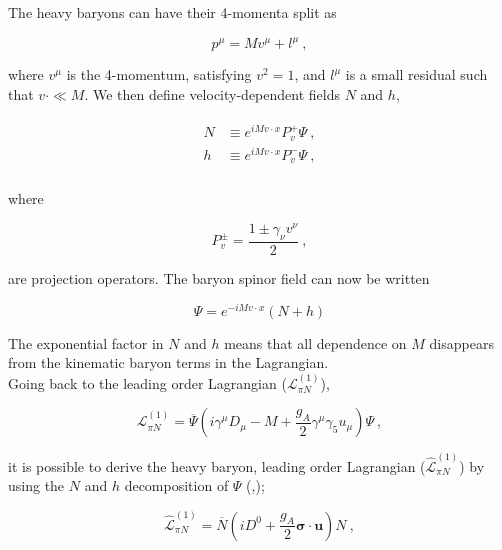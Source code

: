 \documentclass[10pt,twoside]{report}
\begin{document}
	The heavy baryons can have their 4-momenta split as
	
	\begin{equation}
		p^\mu = Mv^\mu + l^\mu\:,
	\end{equation}
	
	\noindent where $v^\mu$ is the 4-momentum, satisfying $v^2 = 1$, and $l^\mu$ is a small residual such that $v\cdot \ll M$. We then define velocity-dependent fields $N$ and $h$,
	
	\begin{align}
		\begin{split}
		N &\equiv e^{iMv\cdot x}P_v^+\Psi\:, \\
		h &\equiv e^{iMv\cdot x}P_v^-\Psi\:, \\
		\end{split}
	\end{align}
	
	\noindent where
	
	\begin{equation}
		P_v^\pm = \frac{1\pm\gamma_\nu v^\nu}{2}\:,
	\end{equation}
	
	\noindent are projection operators. The baryon spinor field can now be written
	
	\begin{equation}
		\Psi = e^{-iMv\cdot x}(N+h)
	\end{equation}
	
	The exponential factor in $N$ and $h$ means that all dependence on $M$ disappears from the kinematic baryon terms in the Lagrangian.\\
	
	Going back to the leading order Lagrangian ($\mathcal{L}_{\pi N}^{(1)}$),
	
	\begin{equation}
	\mathcal{L}_{\pi N}^{(1)} = \overbar{\Psi}\left( i\gamma^\mu D_\mu - M + \frac{g_A}{2}\gamma^\mu\gamma_5u_\mu \right)\Psi \:,
	\end{equation}
	
	\noindent it is possible to derive the heavy baryon, leading order Lagrangian ($\widehat{\mathcal{L}}_{\pi N}^{(1)}$) by using the $N$ and $h$ decomposition of $\Psi$ (\cite{MachleidtEntem11},\cite{SchererSchingler12});
	
	\begin{equation}
		\widehat{\mathcal{L}}_{\pi N}^{(1)} = \overbar{N}\left( iD^0 + \frac{g_A}{2}\bm{\sigma}\cdot \bm{u} \right)N \:,
		\label{ChPtTh | eq | "heavy baryon 1st order L"}
	\end{equation}
	
\end{document}
